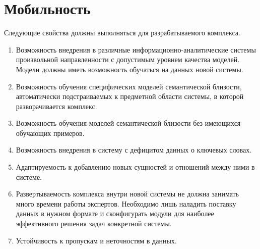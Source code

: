 \section{Мобильность}
Следующие свойства должны выполняться для разрабатываемого комплекса.
\begin{enumerate}
    \item Возможность внедрения в различные информационно-аналитические системы произвольной направленности с допустимым уровнем качества моделей. Модели должны иметь возможность обучаться на данных новой системы.
    \item Возможность обучения специфических моделей семантической близости, автоматически подстраиваемых к предметной области системы, в которой разворачивается комплекс.
    \item Возможность обучения моделей семантической близости без имеющихся обучающих примеров.
    \item Возможность внедрения в систему с дефицитом данных о ключевых словах.
    \item Адаптируемость к добавлению новых сущностей и отношений между ними в системе.
    \item Развертываемость комплекса внутри новой системы не должна занимать много времени работы экспертов. Необходимо лишь наладить поставку данных в нужном формате и сконфигурать модули для наиболее эффективного решения задач конкретной системы.
    \item Устойчивость к пропускам и неточностям в данных.
\end{enumerate}
